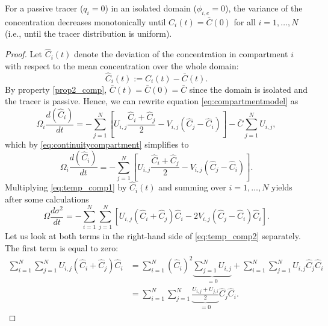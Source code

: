 \begin{property} \label{prop3_comp}
	For a passive tracer ($q_i = 0$) in an isolated domain ($\phi_{i,e} = 0$), the variance of the concentration decreases monotonically until $C_i(t) = \bar{C}(0)$ for all $i = 1,\dots,N$ (i.e., until the tracer distribution is uniform).
\end{property}
\begin{proof}
	Let $\hat{C}_i(t)$ denote the deviation of the concentration in compartment $i$ with respect to the mean concentration over the whole domain:
	\begin{equation}
		\hat{C}_i(t) := C_i(t) - \bar C(t).
	\end{equation}
	By property \ref{prop2_comp}, $\bar C(t) = \bar C(0) = \bar C$ since the domain is isolated and the tracer is passive. Hence, we can rewrite equation \eqref{eq:compartmentmodel} as 
	\begin{equation}
		\Omega_i \frac{d(\hat C_i)}{dt} = - \sum_{j=1}^N \left[ U_{i,j}\frac{\hat C_i + \hat C_j}{2} - V_{i,j} (\hat C_j - \hat C_i)\right] - \bar C \sum_{j=1}^N U_{i,j},
	\end{equation}
	which by \eqref{eq:continuitycompartment} simplifies to
	\begin{equation} \label{eq:temp_comp1}
		\Omega_i \frac{d(\hat C_i)}{dt} = - \sum_{j=1}^N \left[ U_{i,j}\frac{\hat C_i + \hat C_j}{2} - V_{i,j} (\hat C_j - \hat C_i)\right].
	\end{equation}
	Multiplying \eqref{eq:temp_comp1} by $\hat C_i(t)$ and summing over $i = 1,\dots,N$ yields after some calculations
	\begin{equation} \label{eq:temp_comp2}
		\Omega \frac{d \sigma^2}{dt} = - \sum_{i=1}^N \sum_{j=1}^N \left[ U_{i,j}(\hat C_i + \hat C_j)\hat C_i - 2 V_{i,j} (\hat C_j - \hat C_i) \hat C_i\right].
	\end{equation}
	Let us look at both terms in the right-hand side of \eqref{eq:temp_comp2} separately. The first term is equal to zero:
	\begin{subequations}
	 	\begin{align}
	 		\sum_{i=1}^N \sum_{j=1}^N U_{i,j}(\hat C_i + \hat C_j)\hat C_i &= \sum_{i=1}^N \left(\hat C_i \right)^2 \underbrace{\sum_{j=1}^N U_{i,j}}_{= 0} + \sum_{i=1}^N \sum_{j=1}^N U_{i,j}\hat C_j\hat C_i\\
	 		&= \sum_{i=1}^N \sum_{j=1}^N \underbrace{\frac{U_{i,j} + U_{j,i}}{2}}_{=0}\hat C_j\hat C_i.
	 	\end{align}
	 \end{subequations} 

\end{proof}
